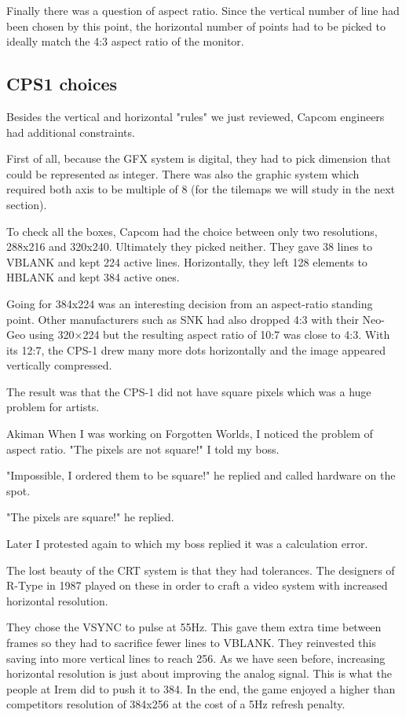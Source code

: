 Finally there was a question of aspect ratio. Since the vertical number of line had been chosen by this point, the horizontal number of points had to be picked to ideally match the 4:3 aspect ratio of the monitor.


\subsection{CPS1 choices}
Besides the vertical and horizontal "rules" we just reviewed, Capcom engineers had additional constraints.

First of all, because the GFX system is digital, they had to pick dimension that could be represented as integer. There was also the graphic system which required both axis to be multiple of 8 (for the tilemaps we will study in the next section).

To check all the boxes, Capcom had the choice between only two resolutions, 288x216 and 320x240. Ultimately they picked neither. They gave 38 lines to VBLANK and kept 224 active lines\cite{petitCRT}. Horizontally, they left 128 elements to HBLANK and kept 384 active ones.  

Going for 384x224 was an interesting decision from an aspect-ratio standing point. Other manufacturers such as SNK had also dropped 4:3 with their Neo-Geo using 320×224 but the resulting aspect ratio of 10:7 was close to 4:3. With its 12:7, the CPS-1 drew many more dots horizontally and the image appeared vertically compressed. 

The result was that the CPS-1 did not have square pixels which was a huge problem for artists.  

\begin{q}{Akiman\cite{akiman}}
When I was working on Forgotten Worlds, I noticed the problem of aspect ratio. "The pixels are not square!" I told my boss.

"Impossible, I ordered them to be square!" he replied and called hardware on the spot.

"The pixels are square!" he replied. 

Later I protested again to which my boss replied it was a calculation error.
\end{q}


\begin{trivia}
The lost beauty of the CRT system is that they had tolerances. The designers of R-Type in 1987 played on these in order to craft a video system with increased horizontal resolution. 

They chose the VSYNC to pulse at 55Hz. This gave them extra time between frames so they had to sacrifice fewer lines to VBLANK. They reinvested this saving into more vertical lines to reach 256. As we have seen before, increasing horizontal resolution is just about improving the analog signal. This is what the people at Irem did to push it to 384. In the end, the game enjoyed a higher than competitors resolution of 384x256 at the cost of a 5Hz refresh penalty.
\end{trivia}



